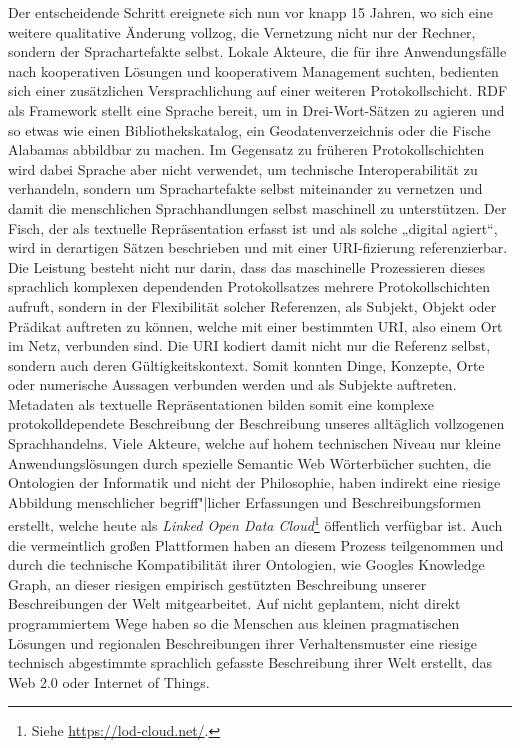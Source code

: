 \documentclass[a4paper,11pt]{article}
\begin{document}
Der entscheidende Schritt ereignete sich nun vor knapp 15 Jahren, wo sich eine
weitere qualitative Änderung vollzog, die Vernetzung nicht nur der Rechner,
sondern der Sprachartefakte selbst.  Lokale Akteure, die für ihre
Anwendungsfälle nach kooperativen Lösungen und kooperativem Management
suchten, bedienten sich einer zusätzlichen Versprachlichung auf einer weiteren
Protokollschicht. RDF als Framework stellt eine Sprache bereit, um in
Drei-Wort-Sätzen zu agieren und so etwas wie einen Bibliothekskatalog, ein
Geodatenverzeichnis oder die Fische Alabamas abbildbar zu machen.  Im
Gegensatz zu früheren Protokollschichten wird dabei Sprache aber nicht
verwendet, um technische Interoperabilität zu verhandeln, sondern um
Sprachartefakte selbst miteinander zu vernetzen und damit die menschlichen
Sprachhandlungen selbst maschinell zu unterstützen.  Der Fisch, der als
textuelle Repräsentation erfasst ist und als solche „digital agiert“, wird in
derartigen Sätzen beschrieben und mit einer URI-fizierung referenzierbar.  Die
Leistung besteht nicht nur darin, dass das maschinelle Prozessieren dieses
sprachlich komplexen dependenden Protokollsatzes mehrere Protokollschichten
aufruft, sondern in der Flexibilität solcher Referenzen, als Subjekt, Objekt
oder Prädikat auftreten zu können, welche mit einer bestimmten URI, also einem
Ort im Netz, verbunden sind. Die URI kodiert damit nicht nur die Referenz
selbst, sondern auch deren Gültigkeitskontext. Somit konnten Dinge, Konzepte,
Orte oder numerische Aussagen verbunden werden und als Subjekte auftreten.
Metadaten als textuelle Repräsentationen bilden somit eine komplexe
protokolldependete Beschreibung der Beschreibung unseres alltäglich
vollzogenen Sprachhandelns. Viele Akteure, welche auf hohem technischen Niveau
nur kleine Anwendungslösungen durch spezielle Semantic Web Wörterbücher
suchten, die Ontologien der Informatik und nicht der Philosophie, haben
indirekt eine riesige Abbildung menschlicher begriff"|licher Erfassungen und
Beschreibungsformen erstellt, welche heute als \emph{Linked Open Data
  Cloud}\footnote{Siehe \url{https://lod-cloud.net/}.}  öffentlich verfügbar
ist. Auch die vermeintlich großen Plattformen haben an diesem Prozess
teilgenommen und durch die technische Kompatibilität ihrer Ontologien, wie
Googles Knowledge Graph, an dieser riesigen empirisch gestützten Beschreibung
unserer Beschreibungen der Welt mitgearbeitet. Auf nicht geplantem, nicht
direkt programmiertem Wege haben so die Menschen aus kleinen pragmatischen
Lösungen und regionalen Beschreibungen ihrer Verhaltensmuster eine riesige
technisch abgestimmte sprachlich gefasste Beschreibung ihrer Welt erstellt,
das Web 2.0 oder Internet of Things.
\end{document}
